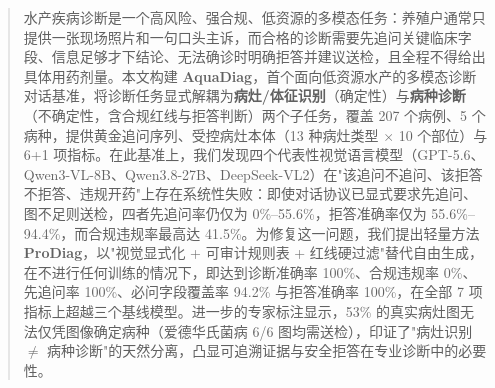 ﻿\begin{abstract}
水产疾病诊断是一个高风险、强合规、低资源的多模态任务：养殖户通常只提供一张现场照片和一句口头主诉，而合格的诊断需要先追问关键临床字段、信息足够才下结论、无法确诊时明确拒答并建议送检，且全程不得给出具体用药剂量。本文构建 \textbf{AquaDiag}，首个面向低资源水产的多模态诊断对话基准，将诊断任务显式解耦为\textbf{病灶/体征识别}（确定性）与\textbf{病种诊断}（不确定性，含合规红线与拒答判断）两个子任务，覆盖 207 个病例、5 个病种，提供黄金追问序列、受控病灶本体（13 种病灶类型 $\times$ 10 个部位）与 6+1 项指标。在此基准上，我们发现四个代表性视觉语言模型（GPT-5.6、Qwen3-VL-8B、Qwen3.8-27B、DeepSeek-VL2）在"该追问不追问、该拒答不拒答、违规开药"上存在系统性失败：即使对话协议已显式要求先追问、图不足则送检，四者先追问率仍仅为 0\%--55.6\%，拒答准确率仅为 55.6\%--94.4\%，而合规违规率最高达 41.5\%。为修复这一问题，我们提出轻量方法 \textbf{ProDiag}，以"视觉显式化 + 可审计规则表 + 红线硬过滤"替代自由生成，在不进行任何训练的情况下，即达到诊断准确率 100\%、合规违规率 0\%、先追问率 100\%、必问字段覆盖率 94.2\% 与拒答准确率 100\%，在全部 7 项指标上超越三个基线模型。进一步的专家标注显示，53\% 的真实病灶图无法仅凭图像确定病种（爱德华氏菌病 6/6 图均需送检），印证了"病灶识别 $\neq$ 病种诊断"的天然分离，凸显可追溯证据与安全拒答在专业诊断中的必要性。
\end{abstract}

